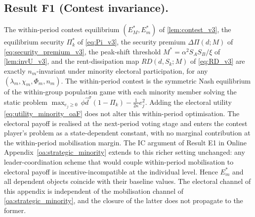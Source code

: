 \documentclass[11pt,twoside]{extarticle}
\begin{document}
\subsection*{Result F1 (Contest invariance).} The within-period contest equilibrium $(E_M^*,E_m^*)$ of \autoref{lem:contest_v3}, the equilibrium security $\Pi_k^*$ of \eqref{eq:Pi_v3}, the security premium $\Delta\Pi(d;M)$ of \eqref{eq:security_premium_v3}, the peak-shift threshold $M^*=\alpha^2 S_AS_B/\xi$ of \autoref{lem:invU_v3}, and the rent-dissipation map $RD(d,S_k;M)$ of \eqref{eq:RD_v3} are exactly $n_m$-invariant under minority electoral participation, for any $(\lambda_m,\chi_m,\Phi_m,n_m)$. The within-period contest is the symmetric Nash equilibrium of the within-group population game with each minority member solving the static problem $\max_{e_j\ge 0}\,\phi\hat d^\sigma(1-\Pi_k)-\tfrac{1}{2\kappa}e_j^2$. Adding the electoral utility \eqref{eq:utility_minority_oaF} does not alter this within-period optimisation. The electoral payoff is realised at the next-period voting stage and enters the contest player's problem as a state-dependent constant, with no marginal contribution at the within-period mobilisation margin. The IC argument of Result E1 in Online Appendix~\ref{oa:strategic_minority} extends to this richer setting unchanged: any leader-coordination scheme that would couple within-period mobilisation to electoral payoff is incentive-incompatible at the individual level. Hence $E_m^*$ and all dependent objects coincide with their baseline values. The electoral channel of this appendix is independent of the mobilisation channel of \autoref{oa:strategic_minority}, and the closure of the latter does not propagate to the former.
\end{document}
